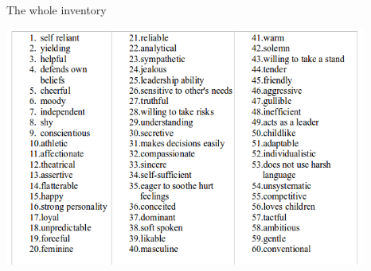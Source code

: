 \documentclass[ignorenonframetext,]{beamer}
\begin{document}
\begin{frame}{The whole inventory}
\protect\hypertarget{the-whole-inventory}{}

\includegraphics[width=4.6875in,height=\textheight]{bem.png}

\end{frame}
\end{document}
